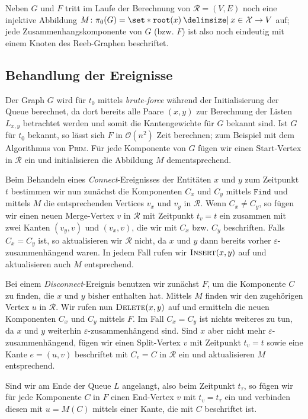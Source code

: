 Neben $G$ und $F$ tritt im Laufe der Berechnung von $\mathcal{R}=(V,E)$ noch eine injektive Abbildung $M \colon \pi_0(G) = \set*{\mathtt{root}(x) \given x \in \mathcal{X}} \to V$ auf; jede Zusammenhangskomponente von $G$ (bzw. $F$) ist also noch eindeutig mit einem Knoten des Reeb-Graphen beschriftet.

\subsection{Behandlung der Ereignisse} %
\label{sub:behandlung_der_ereignisse}
Der Graph $G$ wird für $t_0$ mittels \emph{brute-force} während der Initialisierung der Queue berechnet, da dort bereits alle Paare $(x,y)$ zur Berechnung der Listen $L_{x,y}$ betrachtet werden und somit die Kantengewichte für $G$ bekannt sind.
Ist $G$ für $t_0$ bekannt, so lässt sich $F$ in $\mathcal{O}(n^2)$ Zeit berechnen; zum Beispiel mit dem Algorithmus von \textsc{Prim}.
Für jede Komponente von $G$ fügen wir einen Start-Vertex in $\mathcal{R}$ ein und initialisieren die Abbildung $M$ dementsprechend.

Beim Behandeln eines \emph{Connect}-Ereignisses der Entitäten $x$ und $y$ zum Zeitpunkt $t$ bestimmen wir nun zunächst die Komponenten $C_x$ und $C_y$ mittels $\mathtt{Find}$ und mittels $M$ die entsprechenden Vertices $v_x$ und $v_y$ in $\mathcal{R}$.
Wenn $C_x \neq C_y$, so fügen wir einen neuen Merge-Vertex $v$ in $\mathcal{R}$ mit Zeitpunkt $t_v = t$ ein zusammen mit zwei Kanten $(v_y,v)$ und $(v_x,v)$, die wir mit $C_x$ bzw. $C_y$ beschriften.
Falls $C_x = C_y$ ist, so aktualisieren wir $\mathcal{R}$ nicht, da $x$ und $y$ dann bereits vorher $\varepsilon$-zusammenhängend waren.
In jedem Fall rufen wir $\textsc{Insert}(x,y)$ auf und aktualisieren auch $M$ entsprechend.

Bei einem \emph{Disconnect}-Ereignis benutzen wir zunächst $F$, um die Komponente $C$ zu finden, die $x$ und $y$ bisher enthalten hat.
Mittels $M$ finden wir den zugehörigen Vertex $u$ in $\mathcal{R}$.
Wir rufen nun $\textsc{Delete}(x,y)$ auf und ermitteln die neuen Komponenten $C_x$ und $C_y$ mittels $F$.
Im Fall $C_x=C_y$ ist nichts weiteres zu tun, da $x$ und $y$ weiterhin $\varepsilon$-zusammenhängend sind.
Sind $x$ aber nicht mehr $\varepsilon$-zusammenhängend, fügen wir einen Split-Vertex $v$ mit Zeitpunkt $t_v=t$ sowie eine Kante $e=(u,v)$ beschriftet mit $C_e=C$ in $\mathcal{R}$ ein und aktualisieren $M$ entsprechend.

Sind wir am Ende der Queue $L$ angelangt, also beim Zeitpunkt $t_\tau$, so fügen wir für jede Komponente $C$ in $F$ einen End-Vertex $v$ mit $t_v=t_\tau$ ein und verbinden diesen mit $u=M(C)$ mittels einer Kante, die mit $C$ beschriftet ist.

